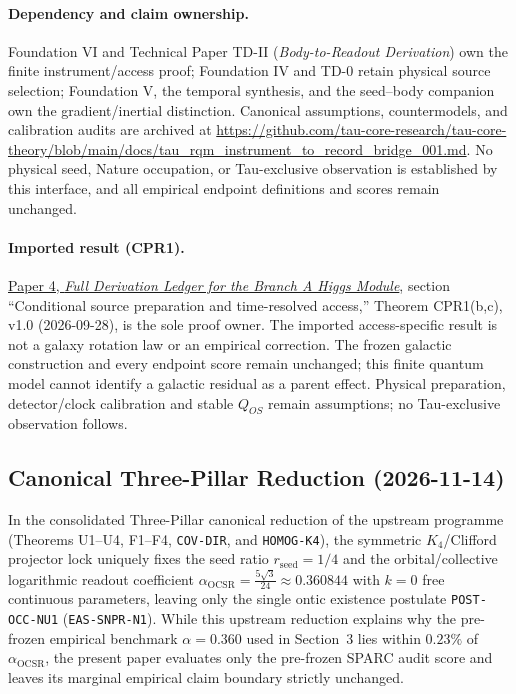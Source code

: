 \documentclass[11pt]{article}
\begin{document}
\paragraph{Dependency and claim ownership.}
Foundation VI and Technical Paper TD-II (\emph{Body-to-Readout Derivation}) own the finite instrument/access proof; Foundation IV and TD-0 retain physical source selection; Foundation V, the temporal synthesis, and the seed--body companion own the gradient/inertial distinction. Canonical assumptions, countermodels, and calibration audits are archived at \url{https://github.com/tau-core-research/tau-core-theory/blob/main/docs/tau_rqm_instrument_to_record_bridge_001.md}. No physical seed, Nature occupation, or Tau-exclusive observation is established by this interface, and all empirical endpoint definitions and scores remain unchanged.

\paragraph{Imported result (CPR1).}
\href{https://github.com/tau-core-research/tau-core-higgs-module-paper4/blob/main/paper4_full_derivation/full_derivation.pdf#nameddest=cpr1}{Paper 4, \emph{Full Derivation Ledger for the Branch A Higgs Module}}, section ``Conditional source preparation and time-resolved access,'' Theorem CPR1(b,c), v1.0 (2026-09-28), is the sole proof owner.
The imported access-specific result is not a galaxy rotation law or an empirical correction. The frozen galactic construction and every endpoint score remain unchanged; this finite quantum model cannot identify a galactic residual as a parent effect.
Physical preparation, detector/clock calibration and stable $Q_{OS}$ remain assumptions; no Tau-exclusive observation follows.

\subsection{Canonical Three-Pillar Reduction (2026-11-14)}
In the consolidated Three-Pillar canonical reduction of the upstream programme (Theorems U1--U4, F1--F4, \texttt{COV-DIR}, and \texttt{HOMOG-K4}), the symmetric $K_4$/Clifford projector lock uniquely fixes the seed ratio $r_{\mathrm{seed}} = 1/4$ and the orbital/collective logarithmic readout coefficient $\alpha_{\mathrm{OCSR}} = \frac{5\sqrt{3}}{24} \approx 0.360844$ with $k = 0$ free continuous parameters, leaving only the single ontic existence postulate \texttt{POST-OCC-NU1} (\texttt{EAS-SNPR-N1}). While this upstream reduction explains why the pre-frozen empirical benchmark $\alpha = 0.360$ used in Section~3 lies within $0.23\%$ of $\alpha_{\mathrm{OCSR}}$, the present paper evaluates only the pre-frozen SPARC audit score and leaves its marginal empirical claim boundary strictly unchanged.
\end{document}
